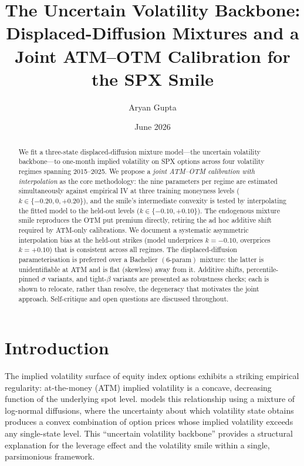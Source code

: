 \documentclass[12pt]{article}
\begin{document}
\title{\bf The Uncertain Volatility Backbone:\\ Displaced-Diffusion Mixtures and a Joint ATM--OTM Calibration for the SPX Smile}
\author{Aryan Gupta}
\date{June 2026}

\maketitle


\bigskip
\noindent

\begin{abstract}
  We fit a three-state displaced-diffusion mixture model---the uncertain volatility backbone---to one-month implied volatility on SPX options across four volatility regimes spanning 2015--2025. We propose a \emph{joint ATM--OTM calibration with interpolation} as the core methodology: the nine parameters per regime are estimated simultaneously against empirical IV at three training moneyness levels ($k \in \{-0.20, 0, +0.20\}$), and the smile's intermediate convexity is tested by interpolating the fitted model to the held-out levels ($k \in \{-0.10, +0.10\}$). The endogenous mixture smile reproduces the OTM put premium directly, retiring the ad hoc additive shift required by ATM-only calibrations. We document a systematic asymmetric interpolation bias at the held-out strikes (model underprices $k=-0.10$, overprices $k=+0.10$) that is consistent across all regimes. The displaced-diffusion parameterisation is preferred over a Bachelier $(6\text{-param})$ mixture: the latter is unidentifiable at ATM and is flat (skewless) away from it. Additive shifts, percentile-pinned $\sigma$ variants, and tight-$\beta$ variants are presented as robustness checks; each is shown to relocate, rather than resolve, the degeneracy that motivates the joint approach. Self-critique and open questions are discussed throughout.
\end{abstract}




\clearpage
\doublespacing

\section{Introduction}

The implied volatility surface of equity index options exhibits a striking empirical regularity: at-the-money (ATM) implied volatility is a concave, decreasing function of the underlying spot level. \citet{A2004} models this relationship using a mixture of log-normal diffusions, where the uncertainty about which volatility state obtains produces a convex combination of option prices whose implied volatility exceeds any single-state level. This ``uncertain volatility backbone'' provides a structural explanation for the leverage effect and the volatility smile within a single, parsimonious framework.
\end{document}
